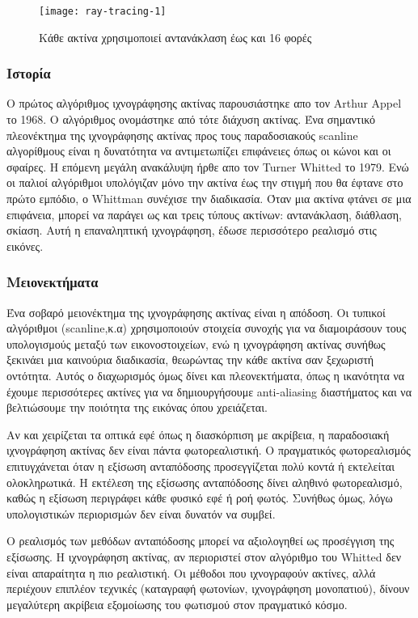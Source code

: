 \begin{figure}[h]
\centering
\texttt{[image: ray-tracing-1]}
\caption{Κάθε ακτίνα χρησιμοποιεί αντανάκλαση έως και 16 φορές}
\end{figure}

\subsubsection{Ιστορία}
Ο πρώτος αλγόριθμος ιχνογράφησης ακτίνας παρουσιάστηκε απο τον Arthur Appel το 1968. Ο αλγόριθμος ονομάστηκε από τότε διάχυση ακτίνας. Ένα σημαντικό πλεονέκτημα της ιχνογράφησης ακτίνας προς τους παραδοσιακούς scanline αλγορίθμους είναι η δυνατότητα να αντιμετωπίζει επιφάνειες όπως οι κώνοι και οι σφαίρες. Η επόμενη μεγάλη ανακάλυψη ήρθε απο τον Turner Whitted το 1979. Ενώ οι παλιοί αλγόριθμοι υπολόγιζαν μόνο την ακτίνα έως την στιγμή που θα έφτανε στο πρώτο εμπόδιο, ο Whittman συνέχισε την διαδικασία. Όταν μια ακτίνα φτάνει σε μια επιφάνεια, μπορεί να παράγει ως και τρεις τύπους ακτίνων: αντανάκλαση, διάθλαση, σκίαση. Αυτή η επαναληπτική ιχνογράφηση, έδωσε περισσότερο ρεαλισμό στις εικόνες.

\subsubsection{Μειονεκτήματα}
Ένα σοβαρό μειονέκτημα της ιχνογράφησης ακτίνας είναι η απόδοση. Οι τυπικοί αλγόριθμοι (scanline,κ.α) χρησιμοποιούν στοιχεία συνοχής για να διαμοιράσουν τους υπολογισμούς μεταξύ των εικονοστοιχείων, ενώ η ιχνογράφηση ακτίνας συνήθως ξεκινάει μια καινούρια διαδικασία, θεωρώντας την κάθε ακτίνα σαν ξεχωριστή οντότητα. Αυτός ο διαχωρισμός όμως δίνει και πλεονεκτήματα, όπως η ικανότητα να έχουμε περισσότερες ακτίνες για να δημιουργήσουμε anti-aliasing διαστήματος και να βελτιώσουμε την ποιότητα της εικόνας όπου χρειάζεται.

Αν και χειρίζεται τα οπτικά εφέ όπως η διασκόρπιση με ακρίβεια, η παραδοσιακή ιχνογράφηση ακτίνας δεν είναι πάντα φωτορεαλιστική. Ο πραγματικός φωτορεαλισμός επιτυγχάνεται όταν η εξίσωση ανταπόδοσης προσεγγίζεται πολύ κοντά ή εκτελείται ολοκληρωτικά. Η εκτέλεση της εξίσωσης ανταπόδοσης δίνει αληθινό φωτορεαλισμό, καθώς η εξίσωση περιγράφει κάθε φυσικό εφέ ή ροή φωτός. Συνήθως όμως, λόγω υπολογιστικών περιορισμών δεν είναι δυνατόν να συμβεί.

Ο ρεαλισμός των μεθόδων ανταπόδοσης μπορεί να αξιολογηθεί ως προσέγγιση της εξίσωσης. Η ιχνογράφηση ακτίνας, αν περιοριστεί στον αλγόριθμο του Whitted\cite{image-1} δεν είναι απαραίτητα η πιο ρεαλιστική. Οι μέθοδοι που ιχνογραφούν ακτίνες, αλλά περιέχουν επιπλέον τεχνικές (καταγραφή φωτονίων, ιχνογράφηση μονοπατιού), δίνουν μεγαλύτερη ακρίβεια εξομοίωσης του φωτισμού στον πραγματικό κόσμο.

